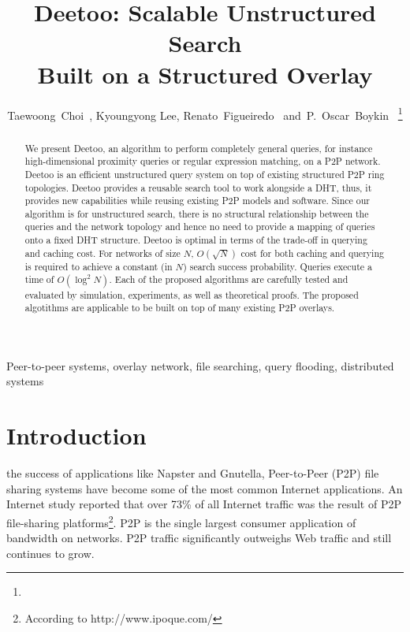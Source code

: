 \documentclass[9.5pt,journal,final,finalsubmission,twocolumn]{IEEEtran}
\begin{document}
\title{Deetoo: Scalable Unstructured Search \\
	Built on a Structured Overlay}
\author{ Taewoong~Choi~,
         Kyoungyong Lee,
         Renato~Figueiredo~
         and~P.~Oscar~Boykin~%
\thanks{}%
}
\maketitle
\begin{abstract}
We present Deetoo, an algorithm to perform completely general queries,
for instance high-dimensional proximity queries or regular expression
matching, on a P2P network.  
Deetoo is an efficient unstructured query system on top of existing 
structured P2P ring topologies.
Deetoo provides a reusable search tool to work alongside a DHT, thus,
it provides new capabilities while reusing existing P2P models and software.
Since our algorithm is for unstructured search, there is
no structural relationship between the queries and the network topology
and hence no need to provide a mapping of queries onto a fixed DHT structure.
Deetoo is optimal in terms of the trade-off in querying and caching cost.
For networks of size $N$,
$O(\sqrt{N})$ cost for both caching and querying is required to achieve
a constant (in $N$) search success probability.  Queries execute a time
of $O(\log^2 N)$.
Each of the proposed algorithms are carefully tested and evaluated by 
simulation, experiments, as well as theoretical proofs. The proposed 
algotithms are applicable to be built on top of many existing P2P 
overlays.

\end{abstract}

\begin{IEEEkeywords}
Peer-to-peer systems, overlay network, file searching,
query flooding, distributed systems
\end{IEEEkeywords}
\section{Introduction}\label{sec:introduction} 
 the success of applications like 
Napster and Gnutella,
Peer-to-Peer (P2P) file sharing systems have become some of the most
common Internet applications. An Internet study reported
that over 73\% of all Internet traffic was 
the result of P2P file-sharing platforms\footnote{According 
to http://www.ipoque.com/}.
P2P is the single largest consumer application of bandwidth on 
networks. P2P traffic significantly outweighs Web traffic 
and still continues to grow\cite{Goth06b}.
\end{document}
